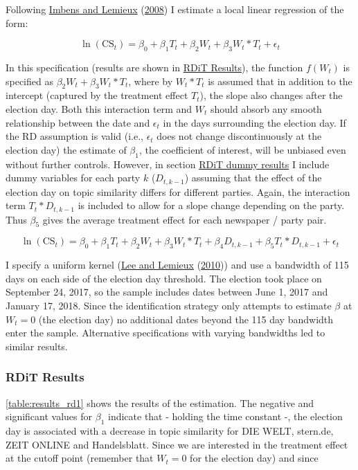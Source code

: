 \documentclass[
]{article}
\begin{document}
Following \protect\hyperlink{ref-imbens_regression_2008}{Imbens and
Lemieux} (\protect\hyperlink{ref-imbens_regression_2008}{2008}) I
estimate a local linear regression of the form:

\[
\ln(\text{CS}_{t})=\beta_0+\beta_1T_t+\beta_2W_t+\beta_3W_t*T_t+\epsilon_t
\]

In this specification (results are shown in
\protect\hyperlink{RDiT-Results}{RDiT Results}), the function \(f(W_t)\)
is specified as \(\beta_2W_t+\beta_3W_t*T_t\), where by \(W_t*T_t\) is
assumed that in addition to the intercept (captured by the treatment
effect \(T_t\)), the slope also changes after the election day. Both
this interaction term and \(W_t\) should absorb any smooth relationship
between the date and \(\epsilon_t\) in the days surrounding the election
day. If the RD assumption is valid (i.e., \(\epsilon_t\) does not change
discontinuously at the election day) the estimate of \(\beta_1\), the
coefficient of interest, will be unbiased even without further controls.
However, in section \protect\hyperlink{RDiT-dummy-results}{RDiT dummy
results} I include dummy variables for each party \(k\) (\(D_{t,k-1}\))
assuming that the effect of the election day on topic similarity differs
for different parties. Again, the interaction term \(T_t*D_{t,k-1}\) is
included to allow for a slope change depending on the party. Thus
\(\beta_5\) gives the average treatment effect for each newspaper /
party pair.

\[
\ln(\text{CS}_{t})=\beta_0+\beta_1T_t+\beta_2W_{t}+\beta_3W_t*T_t+\beta_4D_{t,k-1}+\beta_5T_t*D_{t,k-1}+\epsilon_t
\]

I specify a uniform kernel
(\protect\hyperlink{ref-lee_regression_2010}{Lee and Lemieux}
(\protect\hyperlink{ref-lee_regression_2010}{2010})) and use a bandwidth
of 115 days on each side of the election day threshold. The election
took place on September 24, 2017, so the sample includes dates between
June 1, 2017 and January 17, 2018. Since the identification strategy
only attempts to estimate \(\beta\) at \(W_t=0\) (the election day) no
additional dates beyond the 115 day bandwidth enter the sample.
Alternative specifications with varying bandwidths led to similar
results.

\hypertarget{rdit-results}{%
\subsubsection{RDiT Results}\label{rdit-results}}

\autoref{table:results_rd1} shows the results of the estimation. The
negative and significant values for \(\beta_1\) indicate that - holding
the time constant -, the election day is associated with a decrease in
topic similarity for DIE WELT, stern.de, ZEIT ONLINE and Handelsblatt.
Since we are interested in the treatment effect at the cutoff point
(remember that \(W_t=0\) for the election day) and since
\end{document}

